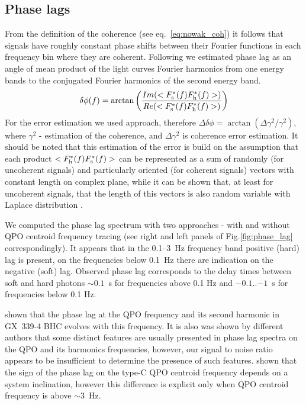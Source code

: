 \documentclass[a4paper,fleqn,usenatbib]{mnras}
\begin{document}
\subsection{Phase lags}
        From the definition of the coherence (see eq.~\ref{eq:nowak_coh}) it follows that signals have roughly constant phase shifts between their Fourier functions in each frequency bin where they are coherent. 
Following \citet{1997ApJ...474L..43V} we estimated phase lag as an angle of mean product of the light curves Fourier harmonics from one energy bands to the conjugated Fourier harmonics of the second energy band. 
\begin{equation}
        \delta \phi(f) = \arctan{\left(\frac{Im(<F_{\rm s}^{*}(f) F_{\rm h}^{*}(f)>)}{Re(<F_{\rm s}^{*}(f) F_{\rm h}^{*}(f)>)}\right)}
\end{equation}
For the error estimation we used \citet{2014A&ARv..22...72U} approach, therefore $\Delta\delta\phi = \arctan{(\Delta\gamma^2/\gamma^2)}$, where $\gamma^2$ - estimation of the coherence, and $\Delta\gamma^2$ is coherence error estimation.
It should be noted that this estimation of the error is build on the assumption that each product $<F_{\rm h}^{*}(f) F_{\rm s}^{*}(f)>$ can be represented as a sum of randomly (for uncoherent signals) and particularly oriented (for coherent signals) vectors with constant length on complex plane, while it can be shown that, at least for uncoherent signals, that the length of this vectors is also random variable with Laplace distribution \citep{2017arXiv170909666H}.

We computed the phase lag spectrum with two approaches - with and without QPO centroid frequency tracing (see right and left panels of Fig.\ref{fig:phase_lag} correspondingly).
It appears that in the 0.1--3~Hz frequency band positive (hard) lag is present, on the frequencies below 0.1~Hz there are indication on the negative (soft) lag.
Observed phase lag corresponds to the delay times between soft and hard photons $\sim0.1$~s for frequencies above 0.1 Hz and $-0.1$..$-1$~s for frequencies below 0.1 Hz.

\citet{2017ApJ...845..143Z} shown that the phase lag at the QPO frequency and its second harmonic in GX~339-4 BHC evolves with this frequency. 
It is also was shown by different authors \citep[see, e.g.,][]{2013ApJ...778..136P, 2017ApJ...845..143Z} that some distinct features are usually presented in phase lag spectra on the QPO and its harmonics frequencies, however, our signal to noise ratio appears to be insufficient to determine the presence of such features.
\citep{2017MNRAS.464.2643V} shown that the sign of the phase lag on the type-C QPO centroid frequency depends on a system inclination, however this difference is explicit only when QPO centroid frequency is above $\sim3$~Hz.
\end{document}

